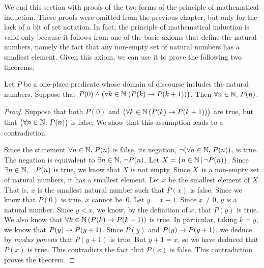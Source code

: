 \medskip

We end this section with proofs of the two forms of the
principle of mathematical induction.  These proofs were omitted 
from the previous chapter, but only for the lack of a bit of set
notation. In fact, the principle of mathematical induction is
valid only because it follows from one of the basic axioms that
define the natural numbers, namely the fact that any non-empty
set of natural numbers has a smallest element.  Given this axiom,
we can use it to prove the following two theorems:


\begin{theorem}\label{T-induction}
Let $P$ be a one-place predicate whose domain of discourse includes
the natural numbers.  Suppose that $P(0)\wedge \big(\forall k\in{\mathbb N}\;(P(k)\rightarrow P(k+1))\big)$.
Then $\forall n\in{\mathbb N},\,P(n)$.
\end{theorem}
\begin{proof}
Suppose that both $P(0)$ and $\big(\forall k\in{\mathbb N}\,(P(k)\rightarrow P(k+1))\big)$ are true,
but that $\big(\forall n\in{\mathbb N},\,P(n)\big)$ is false.  We show that this assumption
leads to a contradiction.

Since the statement $\forall n\in{\mathbb N},\,P(n)$ is false, its negation, $\lnot(\forall n\in{\mathbb N},\,P(n))$,
is true.  The negation is equivalent to $\exists n\in{\mathbb N},\,\lnot P(n)$.
Let $X=\{n\in{\mathbb N}\,|\, \lnot P(n)\}$.  Since $\exists n\in{\mathbb N},\,\lnot P(n)$ is true,
we know that $X$ is not empty.  Since $X$~is a non-empty set of natural numbers,
it has a smallest element.  Let $x$ be
the smallest element of $X$.  That is, $x$ is the smallest natural number
such that $P(x)$ is false.  Since we know that $P(0)$ is true,
$x$ cannot be~0.  Let $y=x-1$.  Since $x\not=0$, $y$ is a natural number.
Since $y<x$, we know, by the definition of $x$, that $P(y)$ is true.
We also know that $\forall k\in{\mathbb N}\,(P(k)\rightarrow P(k+1))$ is true.
In particular, taking $k=y$, we know that $P(y)\rightarrow P(y+1)$.
Since $P(y)$ and $P(y)\rightarrow P(y+1)$, we deduce by \textit{modus ponens}
that $P(y+1)$ is true.  But $y+1=x$, so we have deduced that 
$P(x)$ is true.  This contradicts the fact that $P(x)$ is false.
This contradiction proves the theorem.
\end{proof}


